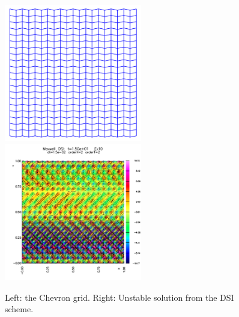 \documentclass[10pt]{article}
\newcommand{\maxDoc}{\homeHenshaw/res/maxwell/doc}
\begin{document}
{
\newcommand{\figWidtha}{6cm}
\begin{figure}
\begin{center}
\includegraphics[width=\figWidtha]{figures/chevronGrid}
\includegraphics[width=\figWidtha]{figures/dsiChevronUnstable}
\end{center}
\caption{Left: the Chevron grid. Right: Unstable solution from the DSI scheme.}
\end{figure}
}
\end{document}
